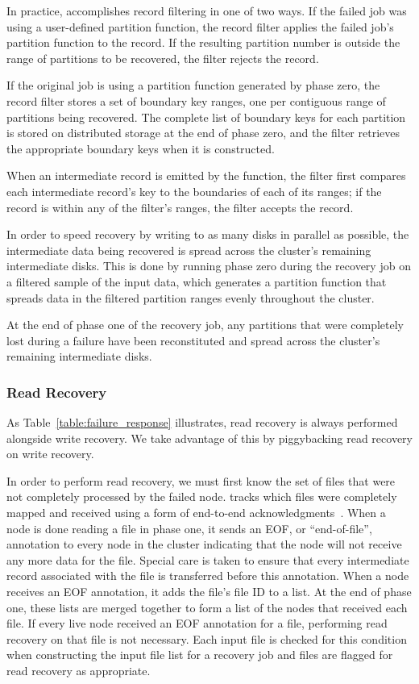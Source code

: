 In practice, \themis accomplishes record filtering in one of two ways. If the
failed job was using a user-defined partition function, the record filter
applies the failed job's partition function to the record. If the resulting
partition number is outside the range of partitions to be recovered, the filter
rejects the record.

If the original job is using a partition function generated by phase zero, the
record filter stores a set of boundary key ranges, one per contiguous range of
partitions being recovered. The complete list of boundary keys for each
partition is stored on distributed storage at the end of phase zero, and the
filter retrieves the appropriate boundary keys when it is constructed.

When an intermediate record is emitted by the \map function, the filter first
compares each intermediate record's key to the boundaries of each of its
ranges; if the record is within any of the filter's ranges, the filter
accepts the record.

In order to speed recovery by writing to as many disks in parallel as possible,
the intermediate data being recovered is spread across the cluster's remaining
intermediate disks. This is done by running phase zero during the recovery job
on a filtered sample of the input data, which generates a partition function
that spreads data in the filtered partition ranges evenly throughout the cluster.

At the end of phase one of the recovery job, any partitions that were
completely lost during a failure have been reconstituted and spread across the
cluster's remaining intermediate disks.

\subsubsection{Read Recovery}

As Table~\ref{table:failure_response} illustrates, read recovery is always
performed alongside write recovery. We take advantage of this by piggybacking
read recovery on write recovery.

In order to perform read recovery, we must first know the set of files that
were not completely processed by the failed node. \themis tracks which files
were completely mapped and received using a form of end-to-end
acknowledgments~\cite{endtoendargument}.  When a node is done reading a file in
phase one, it sends an EOF, or ``end-of-file'', annotation to every node in the
cluster indicating that the node will not receive any more data for the
file. Special care is taken to ensure that every intermediate record associated
with the file is transferred before this annotation. When a node receives an
EOF annotation, it adds the file's file ID to a list. At the end of phase one,
these lists are merged together to form a list of the nodes that received each
file. If every live node received an EOF annotation for a file, performing read
recovery on that file is not necessary. Each input file is checked for this
condition when constructing the input file list for a recovery job and files
are flagged for read recovery as appropriate.

